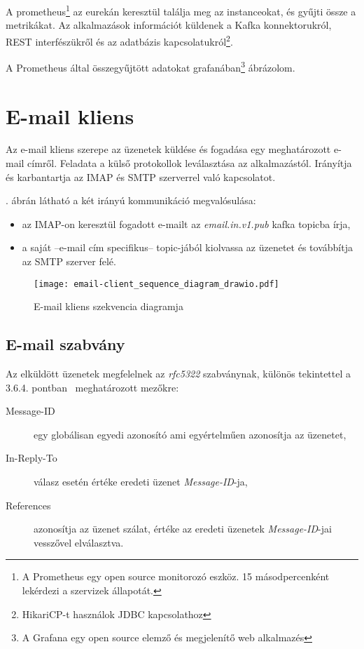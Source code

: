 A prometheus\footnote{A Prometheus egy open source monitorozó eszköz. 15 másodpercenként lekérdezi a szervizek állapotát.} az eurekán keresztül találja meg az instanceokat, és gyűjti össze a metrikákat. Az alkalmazások információt küldenek a Kafka konnektorukról, REST interfészükről és az adatbázis kapcsolatukról\footnote{HikariCP-t használok JDBC kapcsolathoz}.

A Prometheus által összegyűjtött adatokat grafanában\footnote{A Grafana egy open source elemző és megjelenítő web alkalmazés} ábrázolom.






\section{E-mail kliens}
Az e-mail kliens szerepe az üzenetek küldése és fogadása egy meghatározott e-mail címről. Feladata a külső protokollok leválasztása az alkalmazástól. Irányítja és karbantartja az IMAP és SMTP szerverrel való kapcsolatot.

. ábrán látható a két irányú kommunikáció megvalósulása:
\begin{itemize}
	\item az IMAP-on keresztül fogadott e-mailt az \textit{email.in.v1.pub} kafka topicba írja,
	\item a saját --e-mail cím specifikus-- topic-jából kiolvassa az üzenetet és továbbítja  az SMTP szerver felé.
\end{itemize}


\begin{figure}[hbt] 
	\centering
	\texttt{[image: email-client\_sequence\_diagram\_drawio.pdf]}
	\caption{E-mail kliens szekvencia diagramja}
	\label{fig:email-client_sequence_diagram}
\end{figure}




\subsection{E-mail szabvány}
Az elküldött üzenetek megfelelnek az \textit{rfc5322} szabványnak, különös tekintettel a 3.6.4. pontban~\cite{rfc5322_Identification_Fields} meghatározott mezőkre:

\begin{description}
	\item[Message-ID] egy globálisan egyedi azonosító ami egyértelműen azonosítja az üzenetet,
	
	\item[In-Reply-To] válasz esetén értéke eredeti üzenet \textit{Message-ID}-ja,
	
	\item[References] azonosítja az üzenet szálat, értéke az eredeti üzenetek \textit{Message-ID}-jai vesszővel elválasztva.
\end{description}




